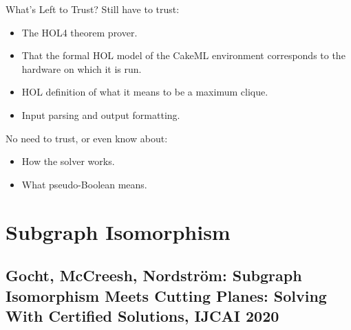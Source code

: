 \documentclass[aspectratio=169,compress,10pt]{beamer}
\begin{document}
\begin{frame}{What's Left to Trust?}
    Still have to trust:
    \begin{itemize}
        \item The HOL4 theorem prover.
        \item That the formal HOL model of the CakeML environment corresponds to the
            hardware on which it is run.
        \item HOL definition of what it means to be a maximum clique.
        \item Input parsing and output formatting.
    \end{itemize}

    \bigskip

    No need to trust, or even know about:
    \begin{itemize}
        \item How the solver works.
        \item What pseudo-Boolean means.
    \end{itemize}
\end{frame}

\section{Subgraph Isomorphism}

\subsection{Gocht, McCreesh, Nordstr\"om: Subgraph Isomorphism Meets Cutting Planes: Solving With Certified Solutions, IJCAI 2020}
\end{document}
